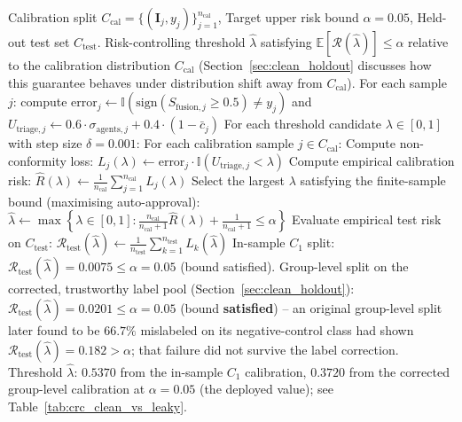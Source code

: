 \documentclass[12pt,a4paper]{report}
\begin{document}
\begin{algorithm}[!htbp]
\caption{Distribution-Free Conformal Risk Control Calibration (CRC)}
\label{alg:conformal_risk_control}
\begin{algorithmic}[1]
\Require Calibration split $C_{\text{cal}} = \{(\mathbf{I}_j, y_j)\}_{j=1}^{n_{\text{cal}}}$, Target upper risk bound $\alpha = 0.05$, Held-out test set $C_{\text{test}}$.
\Ensure Risk-controlling threshold $\hat{\lambda}$ satisfying $\mathbb{E}[\mathcal{R}(\hat{\lambda})] \le \alpha$ relative to the calibration distribution $C_{\text{cal}}$ (Section~\ref{sec:clean_holdout} discusses how this guarantee behaves under distribution shift away from $C_{\text{cal}}$).
\State For each sample $j$: compute $\text{error}_j \leftarrow \mathbb{I}(\text{sign}(S_{\text{fusion}, j} \ge 0.5) \neq y_j)$ and $U_{\text{triage}, j} \leftarrow 0.6 \cdot \sigma_{\text{agents}, j} + 0.4 \cdot (1 - \bar{c}_j)$
\State For each threshold candidate $\lambda \in [0, 1]$ with step size $\delta = 0.001$:
\State \quad For each calibration sample $j \in C_{\text{cal}}$:
\State \qquad Compute non-conformity loss: $L_j(\lambda) \leftarrow \text{error}_j \cdot \mathbb{I}(U_{\text{triage}, j} < \lambda)$ 
\State \quad Compute empirical calibration risk: $\hat{R}(\lambda) \leftarrow \frac{1}{n_{\text{cal}}} \sum_{j=1}^{n_{\text{cal}}} L_j(\lambda)$
\State Select the largest $\lambda$ satisfying the finite-sample bound (maximising auto-approval):
\State \quad $\hat{\lambda} \leftarrow \max \left\{ \lambda \in [0, 1] : \frac{n_{\text{cal}}}{n_{\text{cal}} + 1} \hat{R}(\lambda) + \frac{1}{n_{\text{cal}} + 1} \le \alpha \right\}$
\State Evaluate empirical test risk on $C_{\text{test}}$: $\mathcal{R}_{\text{test}}(\hat{\lambda}) \leftarrow \frac{1}{n_{\text{test}}} \sum_{k=1}^{n_{\text{test}}} L_k(\hat{\lambda})$
\State In-sample $C_1$ split: $\mathcal{R}_{\text{test}}(\hat{\lambda}) = 0.0075 \le \alpha = 0.05$ (bound satisfied). Group-level split on the corrected, trustworthy label pool (Section~\ref{sec:clean_holdout}): $\mathcal{R}_{\text{test}}(\hat{\lambda}) = 0.0201 \le \alpha = 0.05$ (bound \textbf{satisfied}) -- an original group-level split later found to be $66.7\%$ mislabeled on its negative-control class had shown $\mathcal{R}_{\text{test}}(\hat{\lambda}) = 0.182 > \alpha$; that failure did not survive the label correction.
\State \Return Threshold $\hat{\lambda}$: $0.5370$ from the in-sample $C_1$ calibration, $0.3720$ from the corrected group-level calibration at $\alpha=0.05$ (the deployed value); see Table~\ref{tab:crc_clean_vs_leaky}.
\end{algorithmic}
\end{algorithm}
\end{document}
